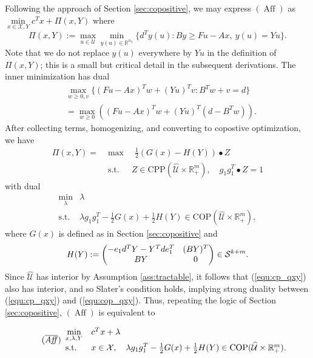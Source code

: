 \documentclass[12pt]{article}
\DeclareMathOperator{\st}{s.t.}
\DeclareMathOperator{\AP}{Aff}
\newcommand{\U}{{\mathcal{U}}}
\newcommand{\K}{\widehat{\mathcal{U}}}
\newcommand{\CP}{{\mathrm{CPP}}}
\newcommand{\COP}{{\mathrm{COP}}}
\newcommand{\X}{{\mathcal{X}}}
\renewcommand{\P}{\Pi}
\def\RR{{\mathbb{R}}}
\newcommand{\Q}{{\K \times \RR^m_+}}
\begin{document}
\begin{onehalfspace}
Following the approach of Section \ref{sec:copositive}, we may express
$(\AP)$ as $\min \limits_{x \in \X, Y} c^Tx + \P(x,Y)$ where
\[
    \P(x,Y) := \max_{u \in \U} \min_{y(u) \in \RR^{n_2}}
    \{ d^T y(u) : By \ge Fu - Ax, \ y(u) = Yu \}.
\]
Note that we do not replace $y(u)$ everywhere by $Yu$ in the definition
of $\P(x,Y)$; this is a small but critical detail in the subsequent
derivations. The inner minimization has dual
\begin{align*}
    &\max \limits_{w \ge 0, v} \{ (Fu - Ax)^T w + (Yu)^T v : B^T w + v = d \} \\
    &= \max \limits_{w \ge 0} \left( (Fu - Ax)^T w + (Yu)^T (d - B^T w) \right).
\end{align*}
After collecting terms, homogenizing, and converting to copostive
optimization, we have
\begin{equation} \label{equ:cp_qxy}
\begin{array}{ll}
    \P(x,Y) = &\max \quad \frac12 (G(x) - H(Y)) \bullet Z \\
&\st \quad \, Z \in \CP(\Q), \quad g_1 g_1^T \bullet Z = 1
\end{array}
\end{equation}
%
with dual
%
\begin{equation} \label{equ:cop_qxy} 
\begin{array}{ll}
\min \limits_{\lambda} & \lambda \\
\st &  \lambda g_1 g_1^T - \tfrac12 G(x) + \tfrac12 H(Y)
\in \COP(\Q),
\end{array}
\end{equation}
%
where $G(x)$ is defined as in Section \ref{sec:copositive} and
\[
    H(Y) := \begin{pmatrix}
        - e_1 d^T Y - Y^T d e_1^T & (BY)^T \\
        BY & 0
    \end{pmatrix}
    \in {\cal S}^{k + m}.
\]
Since $\K$ has interior by Assumption \ref{ass:tractable}, it
follows that (\ref{equ:cp_qxy}) also has interior, and so Slater's
condition holds, implying strong duality between (\ref{equ:cp_qxy})
and (\ref{equ:cop_qxy}). Thus, repeating the logic of Section
\ref{sec:copositive}, $(\AP)$ is equivalent to

\begin{equation} \tag{$\overline{\text{\it Aff\/}}$} \label{equ:cop_ap}
\begin{array}{ll}
\min \limits_{x,\lambda, Y} & c^T x + \lambda \\
\st & x \in \X, \quad \lambda g_1 g_1^T - \tfrac12 G(x) + \tfrac12 H(Y)
\in \COP(\Q).
\end{array}
\end{equation}


\end{onehalfspace}
\end{document}
